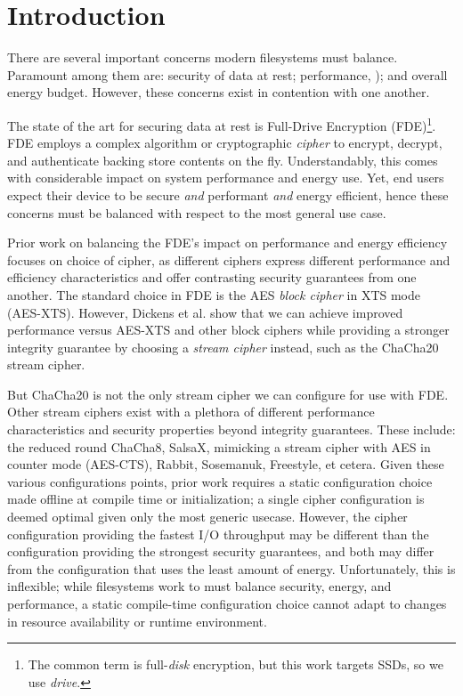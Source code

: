 \section{Introduction}\label{sec:introduction}

There are several important concerns modern filesystems must balance.
Paramount among them are: security of data at rest; performance, ); and overall energy budget. However, these concerns exist in
contention with one another. 

The state of the art for securing data at rest is Full-Drive Encryption
(FDE)\footnote{The common term is full-\emph{disk} encryption, but this work
targets SSDs, so we use \emph{drive}.}. FDE employs a complex algorithm or
cryptographic \emph{cipher} to encrypt, decrypt, and authenticate backing store
contents on the fly. Understandably, this comes with considerable impact on
system performance and energy use.  Yet, end users expect their
device to be secure \emph{and} performant \emph{and} energy efficient, hence
these concerns must be balanced with respect to the most general use case.

Prior work on balancing the FDE's impact on performance and energy efficiency
focuses on choice of cipher, as different ciphers express different performance
and efficiency characteristics and offer contrasting security guarantees from
one another. The standard choice in FDE is the AES \emph{block cipher} in XTS
mode (AES-XTS). However, Dickens et al. show that we can achieve improved
performance versus AES-XTS and other block ciphers while providing a stronger
integrity guarantee by choosing a \emph{stream cipher} instead, such as the
ChaCha20\cite{ChaCha20} stream cipher.

But ChaCha20 is not the only stream cipher we can configure for use with FDE.
Other stream ciphers exist with a plethora of different performance
characteristics and security properties beyond integrity guarantees. These
include: the reduced round ChaCha8\cite{ChaCha8}, SalsaX\cite{SalsaX}, mimicking
a stream cipher with AES in counter mode (AES-CTS)\cite{AES-CTR},
Rabbit\cite{Rabbit}, Sosemanuk\cite{Sosemanuk}, Freestyle\cite{Freestyle}, et
cetera. Given these various configurations points, prior work requires a static
configuration choice made offline at compile time or initialization; a single
cipher configuration is deemed optimal given only the most generic usecase.
However, the cipher configuration providing the fastest I/O throughput may be
different than the configuration providing the strongest security guarantees,
and both may differ from the configuration that uses the least amount of energy.
Unfortunately, this is inflexible; while filesystems work to must balance
security, energy, and performance, a static compile-time configuration choice
cannot adapt to changes in resource availability or runtime environment.

